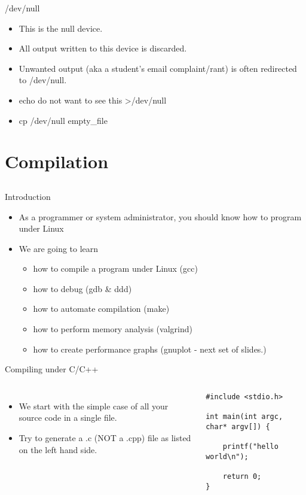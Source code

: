 \documentclass{beamer}
\begin{document}
\begin{frame}{/dev/null}
\begin{itemize}
\item This is the null device.
\item All output written to this device is discarded.
\item Unwanted output (aka a student's email complaint/rant) is often redirected to /dev/null.
\item echo do not want to see this >/dev/null
\item cp /dev/null empty\_file
\end{itemize}
\end{frame}

\section{Compilation}
\subsection{}
\begin{frame}{Introduction}
\begin{itemize}
\item As a programmer or system administrator, you should know how to program under Linux
\item We are going to learn 
\begin{itemize}
\item how to compile a program under Linux (gcc)
\item how to debug (gdb \& ddd)
\item how to automate compilation (make)
\item how to perform memory analysis (valgrind)
\item how to create performance graphs (gnuplot - next set of slides.)
\end{itemize}
\end{itemize}
\end{frame}

\begin{frame}[fragile]{Compiling under C/C++}
\begin{columns}[c]
\begin{itemize}
\item We start with the simple case of all your source code in a single file.
\item Try to generate a .c (NOT a .cpp) file as listed on the left hand side.
\end{itemize}
\begin{lstlisting}
#include <stdio.h>

int main(int argc, char* argv[]) {

    printf("hello world\n");

    return 0;
}
\end{lstlisting}
\end{columns}
\end{frame}
\end{document}
